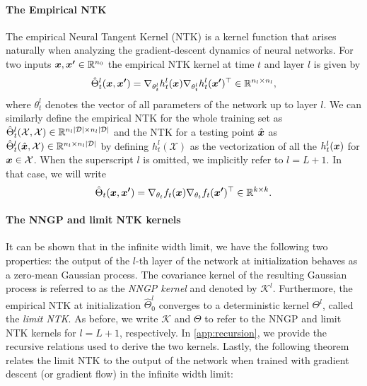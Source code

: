 \paragraph{The Empirical NTK} The empirical Neural Tangent Kernel (NTK) is a kernel function that arises naturally when analyzing the gradient-descent dynamics of neural networks. For two inputs $\boldsymbol{x}, \boldsymbol{x'} \in \mathbb{R}^{n_0}$ the empirical NTK kernel at time $t$ and layer $l$ is given by
\begin{equation*}
  \hat{\Theta}^l_t(\boldsymbol{x}, \boldsymbol{x'}) = \nabla_{\theta^l_t} h^l_t(\boldsymbol{x}) \nabla_{\theta^l_t} h^l_t(\boldsymbol{x'})^\top \in \mathbb{R}^{n_l \times n_l},
\end{equation*}
where $\theta^l_t$ denotes the vector of all parameters of the network up to layer $l$. We can similarly define the empirical NTK for the whole training set as $\hat{\Theta}^l_t(\mathcal{X}, \mathcal{X})\in \mathbb{R}^{n_l|\mathcal{D}| \times n_l|\mathcal{D}|}$ and the NTK for a testing point $\hat{\boldsymbol{x}}$ as  $\hat{\Theta}^l_t(\hat{\boldsymbol{x}}, \mathcal{\mathcal{X}})\in \mathbb{R}^{n_l \times n_l|\mathcal{D}|}$ by defining $h^l_t(\mathcal{X})$ as the vectorization of all the $h^l_t(\boldsymbol{x})$ for $\boldsymbol{x} \in \mathcal{X}$. When the superscript $l$ is omitted, we implicitly refer to $l=L+1$. In that case, we will write 
\begin{equation*}
\hat{\Theta}_t(\boldsymbol{x}, \boldsymbol{x'}) = \nabla_{\theta_t} f_t(\boldsymbol{x}) \nabla_{\theta_t}f_t(\boldsymbol{x'})^\top \in \mathbb{R}^{k\times k}.
\end{equation*}

\paragraph{The NNGP and limit NTK kernels} It can be shown that in the infinite width limit, we have the following two properties: the output of the $l$-th layer of the network at
initialization behaves as a zero-mean Gaussian process. The covariance kernel of the resulting Gaussian process is referred to as the \textit{NNGP kernel} and denoted by $\mathcal{K}^{l}$. Furthermore, the empirical NTK at initialization $\hat{\Theta}_0^{l}$ converges to a deterministic kernel $\Theta^{l}$, called the \textit{limit NTK}.
As before, we write $\mathcal{K}$ and $\Theta$ to refer to the NNGP and limit NTK kernels for $l = L+1$, respectively. In \cref{app:recursion}, we provide the recursive relations used to derive the two kernels. Lastly, the following theorem relates the limit NTK to the output of the network when trained with
gradient descent (or gradient flow) in the infinite width limit:

